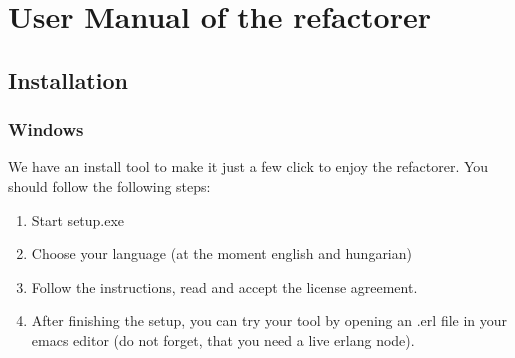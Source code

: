 \documentclass[12pt]{article}
\begin{document}
\section{User Manual of the refactorer}

\subsection{Installation}
\subsubsection{Windows}
We have an install tool to make it just a few click to enjoy the refactorer.
You should follow the following steps:
\begin{enumerate}
	\item Start setup.exe
	\item Choose your language (at the moment english and hungarian)
	\item Follow the instructions, read and accept the license agreement.
	\item After finishing the setup, you can try your tool by opening an .erl file in your emacs editor (do not forget, that you need a live erlang node).
\end{enumerate}
\end{document}
